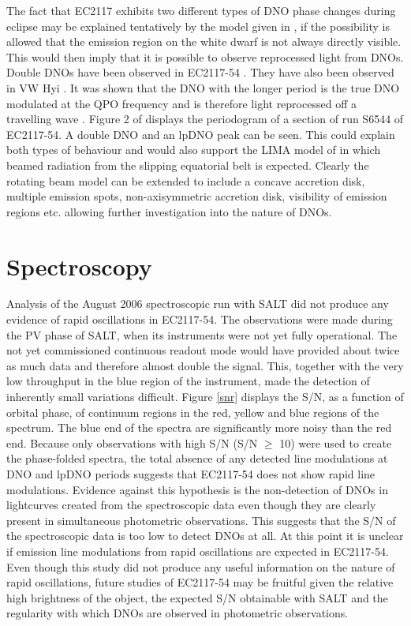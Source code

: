 The fact that EC2117 exhibits two different types of DNO phase changes during eclipse may be explained tentatively by the model given in \cite{1980ApJ...241..247P}, if the possibility is allowed that the emission region on the white dwarf is not always directly visible. This would then imply that it is possible to observe reprocessed light from DNOs. Double DNOs have been observed in EC2117-54 \cite{WWP}. They have also been observed in VW Hyi \citep{warner_ro2004}. It was shown that the DNO with the longer period is the true DNO modulated at the QPO frequency and is therefore light reprocessed off a travelling wave \citep{DNOQPO_II}. Figure 2 of \cite{WWP} displays the periodogram of a section of run S6544 of EC2117-54. A double DNO and an lpDNO peak can be seen. This could explain both types of behaviour and would also support the LIMA model of \cite{DNOQPO_II} in which beamed radiation from the slipping equatorial belt is expected. Clearly the rotating beam model \citep{1980ApJ...241..247P} can be extended to include a concave accretion disk, multiple emission spots, non-axisymmetric accretion disk, visibility of emission regions etc. allowing further investigation into the nature of DNOs.


\section{Spectroscopy}

Analysis of the August 2006 spectroscopic run with SALT did not produce any evidence of rapid oscillations in EC2117-54. The observations were made during the PV phase of SALT, when its instruments were not yet fully operational. The not yet commissioned continuous readout mode would have provided about twice as much data and therefore almost double the signal. This, together with the very low throughput in the blue region of the instrument, made the detection of inherently small variations difficult. Figure \ref{snr} displays the S/N, as a function of orbital phase, of continuum regions in the red, yellow and blue regions of the spectrum. The blue end of the spectra are significantly more noisy than the red end. Because only observations with high S/N (S/N $\geq$ 10) were used to create the phase-folded spectra, the total absence of any detected line modulations at DNO and lpDNO periods suggests that EC2117-54 does not show rapid line modulations. Evidence against this hypothesis is the non-detection of DNOs in lightcurves created from the spectroscopic data even though they are clearly present in simultaneous photometric observations. This suggests that the S/N of the spectroscopic data is too low to detect DNOs at all. At this point it is unclear if emission line modulations from rapid oscillations are expected in EC2117-54. Even though this study did not produce any useful information on the nature of rapid oscillations, future studies of EC2117-54 may be fruitful given the relative high brightness of the object, the expected S/N obtainable with SALT and the regularity with which DNOs are observed in photometric observations.

